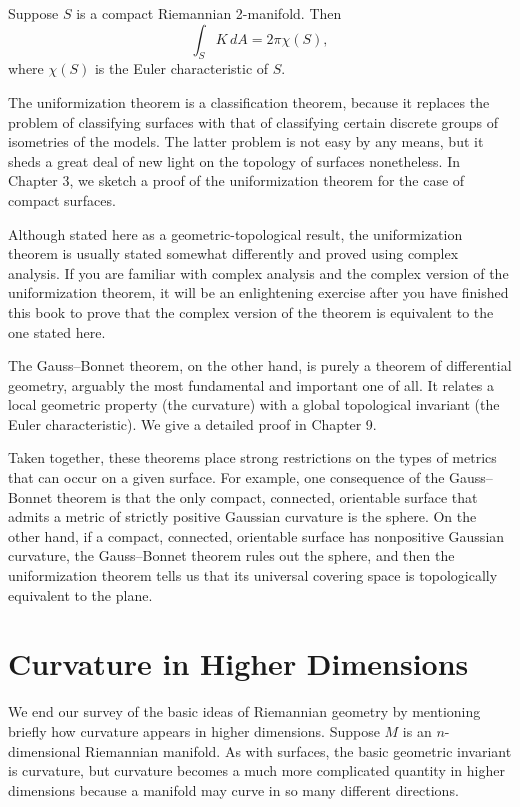 \begin{theorem}
\label{thm:gauss-bonnet-theorem-preview}
\notready
Suppose $S$ is a compact Riemannian 2-manifold. Then
\[
\int_S K \, dA = 2\pi \chi(S),
\]
where $\chi(S)$ is the Euler characteristic of $S$.
\end{theorem}

The uniformization theorem is a classification theorem, because it replaces the problem of classifying surfaces with that of classifying certain discrete groups of isometries of the models. The latter problem is not easy by any means, but it sheds a great deal of new light on the topology of surfaces nonetheless. In Chapter 3, we sketch a proof of the uniformization theorem for the case of compact surfaces.

Although stated here as a geometric-topological result, the uniformization theorem is usually stated somewhat differently and proved using complex analysis. If you are familiar with complex analysis and the complex version of the uniformization theorem, it will be an enlightening exercise after you have finished this book to prove that the complex version of the theorem is equivalent to the one stated here.

The Gauss--Bonnet theorem, on the other hand, is purely a theorem of differential geometry, arguably the most fundamental and important one of all. It relates a local geometric property (the curvature) with a global topological invariant (the Euler characteristic). We give a detailed proof in Chapter 9.

Taken together, these theorems place strong restrictions on the types of metrics that can occur on a given surface. For example, one consequence of the Gauss--Bonnet theorem is that the only compact, connected, orientable surface that admits a metric of strictly positive Gaussian curvature is the sphere. On the other hand, if a compact, connected, orientable surface has nonpositive Gaussian curvature, the Gauss--Bonnet theorem rules out the sphere, and then the uniformization theorem tells us that its universal covering space is topologically equivalent to the plane.

\section{Curvature in Higher Dimensions}

We end our survey of the basic ideas of Riemannian geometry by mentioning briefly how curvature appears in higher dimensions. Suppose $M$ is an $n$-dimensional Riemannian manifold. As with surfaces, the basic geometric invariant is curvature, but curvature becomes a much more complicated quantity in higher dimensions because a manifold may curve in so many different directions.

